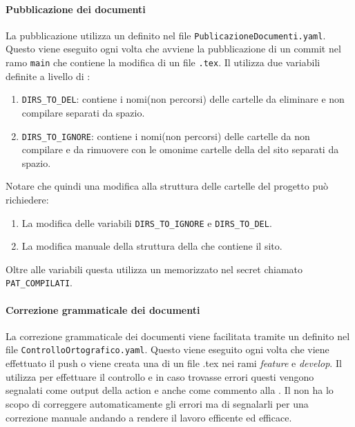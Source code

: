 \paragraph{Pubblicazione dei documenti}
\label{par:pubblicazione_documenti}
La pubblicazione utilizza un  definito nel file \texttt{PublicazioneDocumenti.yaml}.
Questo  viene eseguito ogni volta che avviene la pubblicazione di un commit nel ramo \texttt{main} che contiene la modifica di un file \texttt{.tex}.
Il  utilizza due variabili definite a livello di :
\begin{enumerate}
    \item \texttt{DIRS\_TO\_DEL}: contiene i nomi(non percorsi) delle cartelle da eliminare e non compilare separati da spazio.
    \item \texttt{DIRS\_TO\_IGNORE}: contiene i nomi(non percorsi) delle cartelle da non compilare e da rimuovere con le omonime cartelle della  del sito separati da spazio.
\end{enumerate}
Notare che quindi una modifica alla struttura delle cartelle del progetto può richiedere:
\begin{enumerate}
    \item La modifica delle variabili \texttt{DIRS\_TO\_IGNORE} e \texttt{DIRS\_TO\_DEL}.
    \item La modifica manuale della struttura della  che contiene il sito.
\end{enumerate}
Oltre alle variabili questa  utilizza un \textbf{} memorizzato nel secret chiamato \texttt{PAT\_COMPILATI}.

\paragraph{Correzione grammaticale dei documenti}
\label{par:correzione_grammaticale}
La correzione grammaticale dei documenti viene facilitata tramite un  definito nel file \texttt{ControlloOrtografico.yaml}.
Questo  viene eseguito ogni volta che viene effettuato il push o viene creata una  di un file .tex nei rami \textit{feature} e \textit{develop}.
Il  utilizza  per effettuare il controllo e in caso trovasse errori questi vengono segnalati come output della action e anche come commento alla .
Il  non ha lo scopo di correggere automaticamente gli errori ma di segnalarli per una correzione manuale andando a rendere il lavoro efficente ed efficace. 

